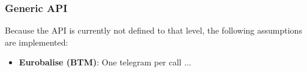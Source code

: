 
\subsubsection{Generic API}
Because the API is currently not defined to that level, the following assumptions are implemented:
\begin{itemize}
\item \textbf{Eurobalise (BTM)}: One telegram per call ...
\end{itemize}